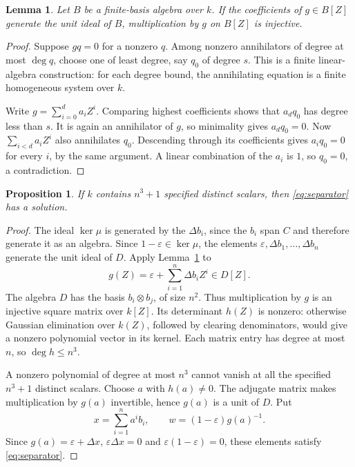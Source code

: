 \documentclass[11pt]{article}
\newtheorem{proposition}[theorem]{Proposition}
\newtheorem{lemma}[theorem]{Lemma}
\theoremstyle{definition}
\theoremstyle{remark}
\newcommand{\eps}{\varepsilon}
\newcommand{\Del}{\Delta}
\begin{document}
\begin{lemma}\label{lem:primitive-polynomial}
Let $B$ be a finite-basis algebra over $k$. If the coefficients of
$g\in B[Z]$ generate the unit ideal of $B$, multiplication by $g$
on $B[Z]$ is injective.
\end{lemma}
\begin{proof}
Suppose $gq=0$ for a nonzero $q$. Among nonzero annihilators of degree
at most $\deg q$, choose one of least degree, say $q_0$ of degree $s$.
This is a finite linear-algebra construction: for each degree bound,
the annihilating equation is a finite homogeneous system over $k$.

Write $g=\sum_{i=0}^d a_iZ^i$. Comparing highest coefficients shows
that $a_dq_0$ has degree less than $s$. It is again an annihilator
of $g$, so minimality gives $a_dq_0=0$.
Now $\sum_{i<d}a_iZ^i$ also annihilates $q_0$. Descending through its
coefficients gives $a_iq_0=0$ for every $i$, by the same argument.
A linear combination of the $a_i$ is $1$, so $q_0=0$, a contradiction.
\end{proof}

\begin{proposition}\label{prop:separator}
If $k$ contains $n^3+1$ specified distinct scalars, then
\eqref{eq:separator} has a solution.
\end{proposition}
\begin{proof}
The ideal $\ker\mu$ is generated by the $\Del b_i$, since the $b_i$
span $C$ and therefore generate it as an algebra. Since
$1-\eps\in\ker\mu$, the elements
$\eps,\Del b_1,\ldots,\Del b_n$ generate the unit ideal of $D$.
Apply Lemma~\ref{lem:primitive-polynomial} to
\[
 g(Z)=\eps+\sum_{i=1}^n\Del b_i Z^i\in D[Z].
\]
The algebra $D$ has the basis $b_i\otimes b_j$, of size $n^2$.
Thus multiplication by $g$ is an injective square matrix over $k[Z]$.
Its determinant $h(Z)$ is nonzero: otherwise Gaussian elimination
over $k(Z)$, followed by clearing denominators, would give a nonzero
polynomial vector in its kernel. Each matrix entry has degree at most
$n$, so $\deg h\leq n^3$.

A nonzero polynomial of degree at most $n^3$ cannot vanish at all
the specified $n^3+1$ distinct scalars. Choose $a$ with $h(a)\ne0$.
The adjugate matrix makes multiplication by $g(a)$ invertible, hence
$g(a)$ is a unit of $D$. Put
\[
 x=\sum_{i=1}^n a^i b_i,\qquad
 w=(1-\eps)g(a)^{-1}.
\]
Since $g(a)=\eps+\Del x$, $\eps\Del x=0$ and
$\eps(1-\eps)=0$, these elements satisfy \eqref{eq:separator}.
\end{proof}
\end{document}
